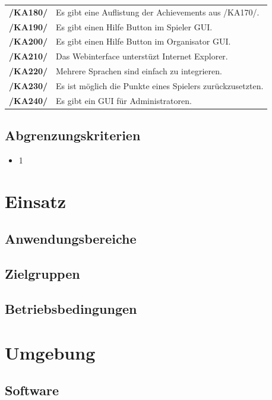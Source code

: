 \documentclass[a4paper]{scrreprt}
\begin{document}
\begin{tabularx}{\linewidth}{@{}>{\bfseries}l@{\hspace{.5em}}X@{}}
/KA180/ & Es gibt eine Auflistung der \Gls{Achievement}s aus /KA170/. \\
/KA190/ & Es gibt einen Hilfe Button im \Gls{Spieler} GUI. \\ %
/KA200/ & Es gibt einen Hilfe Button im \Gls{Organisator} GUI. \\ %
/KA210/ & Das Webinterface unterstüzt Internet Explorer. \\
/KA220/ & Mehrere Sprachen sind einfach zu integrieren. \\ 
/KA230/ & Es ist möglich die Punkte eines \Gls{Spieler}s zurückzusetzten. \\ %
/KA240/ & Es gibt ein GUI für \Gls{Administrator}en. \\ %
\end{tabularx}

\section{Abgrenzungskriterien}
\begin{itemize} 
  \item 1
\end{itemize} 
 
\chapter{Einsatz}
 
\section{Anwendungsbereiche}
 
\section{Zielgruppen}
 
\section{Betriebsbedingungen}
 
\chapter{Umgebung}
 
\section{Software}
 
\end{document}
